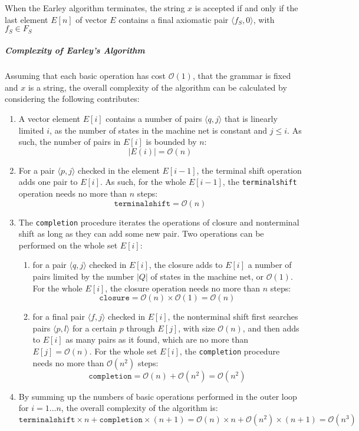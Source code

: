 \documentclass[english]{article}
\begin{document}
\bigskip
\begin{property}
  When the Earley algorithm terminates, the string \(x\) is accepted if and only if the last element \(E[n]\) of vector \(E\) contains a final axiomatic pair \(\langle f_S, 0 \rangle\), with \(f_S \in F_S\)
\end{property}

\subparagraph*{Complexity of Earley's Algorithm}
Assuming that each basic operation has cost \(\mathcal{O}(1)\), that the grammar is fixed and \(x\) is a string, the overall complexity of the algorithm can be calculated by considering the following contributes:

\begin{enumerate}
  \item A vector element \(E[i]\) contains a number of pairs \(\langle q, j \rangle\) that is linearly limited \(i\), as the number of states in the machine net is constant and \(j \leq i\). As such, the number of pairs in \(E[i]\) is bounded by \(n\): \[ |E(i)| = \mathcal{O}(n) \]
  \item For a pair \(\langle p, j \rangle\) checked in the element \(E[i-1]\), the terminal shift operation adds one pair to \(E[i]\). As such, for the whole \(E[i-1]\), the \texttt{terminalshift} operation needs no more than \(n\) steps: \[ \texttt{terminalshift} = \mathcal{O}(n) \]
  \item The \texttt{completion} procedure iterates the operations of closure and nonterminal shift as long as they can add some new pair. Two operations can be performed on the whole set \(E[i]\):
        \begin{enumerate}
          \item for a pair \(\langle q, j\rangle\) checked in \(E[i]\), the closure adds to \(E[i]\) a number of pairs limited by the number \(|Q|\) of states in the machine net, or \(\mathcal{O}(1)\). For the whole \(E[i]\), the closure operation needs no more than \(n\) steps: \[ \texttt{closure} = \mathcal{O}(n) \times \mathcal{O}(1) = \mathcal{O}(n) \]
          \item for a final pair \(\langle f, j \rangle\) checked in \(E[i]\), the nonterminal shift first searches pairs \(\langle p, l\rangle\) for a certain \(p\) through \(E[j]\), with size \(\mathcal{O}(n)\), and then adds to \(E[i]\) as many pairs as it found, which are no more than \(E[j] = \mathcal{O}(n)\). For the whole set \(E[i]\), the \texttt{completion} procedure needs no more than \(\mathcal{O}(n^2)\) steps: \[ \texttt{completion} = \mathcal{O}(n) + \mathcal{O}(n^2) = \mathcal{O}(n^2) \]
        \end{enumerate}
  \item By summing up the numbers of basic operations performed in the outer loop for \(i = 1 \dots n\), the overall complexity of the algorithm is: \[ \texttt{terminalshift} \times n + \texttt{completion} \times (n+1) = \mathcal{O}(n) \times n + \mathcal{O}(n^2) \times (n + 1) = \mathcal{O}(n^3) \]
\end{enumerate}
\end{document}
